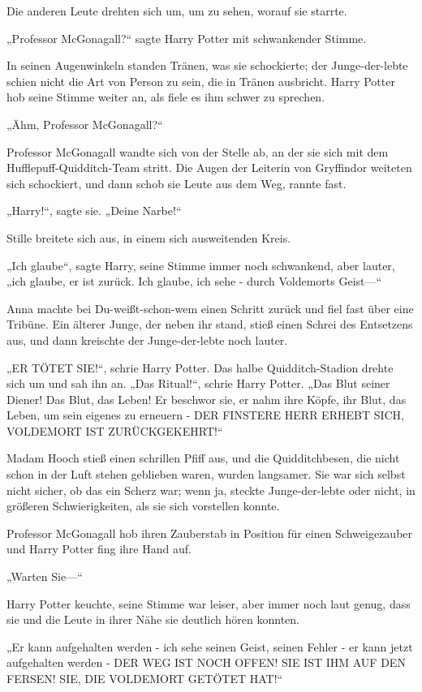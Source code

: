 {Die anderen Leute drehten sich um, um zu sehen, worauf sie starrte.

„Professor McGonagall?“ sagte Harry Potter mit schwankender Stimme.

In seinen Augenwinkeln standen Tränen, was sie schockierte; der Junge-der-lebte schien nicht die Art von Person zu sein, die in Tränen ausbricht. Harry Potter hob seine Stimme weiter an, als fiele es ihm schwer zu sprechen.

„Ähm, Professor McGonagall?“

Professor McGonagall wandte sich von der Stelle ab, an der sie sich mit dem Hufflepuff-Quidditch-Team stritt. Die Augen der Leiterin von Gryffindor weiteten sich schockiert, und dann schob sie Leute aus dem Weg, rannte fast.

„Harry!“, sagte sie. „Deine Narbe!“

Stille breitete sich aus, in einem sich ausweitenden Kreis.

„Ich glaube“, sagte Harry, seine Stimme immer noch schwankend, aber lauter, „ich glaube, er ist zurück. Ich glaube, ich sehe - durch Voldemorts Geist—“

Anna machte bei Du-weißt-schon-wem einen Schritt zurück und fiel fast über eine Tribüne. Ein älterer Junge, der neben ihr stand, stieß einen Schrei des Entsetzens aus, und dann kreischte der Junge-der-lebte noch lauter.

„ER TÖTET SIE!“, schrie Harry Potter. Das halbe Quidditch-Stadion drehte sich um und sah ihn an. „Das Ritual!“, schrie Harry Potter. „Das Blut seiner Diener! Das Blut, das Leben! Er beschwor sie, er nahm ihre Köpfe, ihr Blut, das Leben, um sein eigenes zu erneuern - DER FINSTERE HERR ERHEBT SICH, VOLDEMORT IST ZURÜCKGEKEHRT!“

Madam Hooch stieß einen schrillen Pfiff aus, und die Quidditchbesen, die nicht schon in der Luft stehen geblieben waren, wurden langsamer. Sie war sich selbst nicht sicher, ob das ein Scherz war; wenn ja, steckte Junge-der-lebte oder nicht, in größeren Schwierigkeiten, als sie sich vorstellen konnte.

Professor McGonagall hob ihren Zauberstab in Position für einen Schweigezauber und Harry Potter fing ihre Hand auf.

„Warten Sie—“

Harry Potter keuchte, seine Stimme war leiser, aber immer noch laut genug, dass sie und die Leute in ihrer Nähe sie deutlich hören konnten.

„Er kann aufgehalten werden - ich sehe seinen Geist, seinen Fehler - er kann jetzt aufgehalten werden - DER WEG IST NOCH OFFEN! SIE IST IHM AUF DEN FERSEN! SIE, DIE VOLDEMORT GETÖTET HAT!“

}
